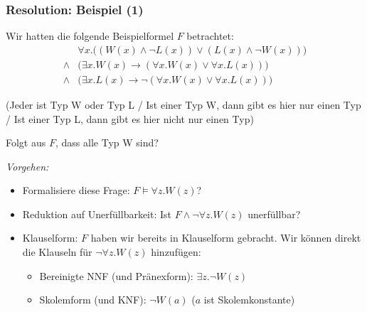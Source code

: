\documentclass[aspectratio=1610,onlymath]{beamer}
\begin{document}
\begin{frame}\frametitle{Resolution: Beispiel (1)}
 
 Wir hatten die folgende Beispielformel $F$ betrachtet:
%  
 \begin{align*}
& \forall x.\big((W(x)\wedge\neg L(x))\vee (L(x)\wedge\neg W(x))\big) \\
{}\wedge{} & \big(\exists x.W(x)\to(\forall x.W(x) \vee \forall x.L(x))\big) \\
{}\wedge{} & \big(\exists x.L(x)\to\neg(\forall x.W(x) \vee \forall x.L(x))\big)
\end{align*}

(Jeder ist Typ W oder Typ L / Ist einer Typ W, dann gibt es hier nur einen Typ / Ist einer Typ L, dann gibt es hier nicht nur einen Typ)\medskip

\alert{Folgt aus $F$, dass alle Typ W sind?}\bigskip\pause

\emph{Vorgehen:}
\begin{itemize}
\item Formalisiere diese Frage: \alert{$F\models \forall z.W(z)$?}\pause
\item Reduktion auf Unerfüllbarkeit: \alert{Ist $F\wedge\neg\forall z.W(z)$ unerfüllbar?}\pause
\item Klauselform: $F$ haben wir bereits in Klauselform gebracht. Wir können direkt die \alert{Klauseln für $\neg\forall z.W(z)$} hinzufügen:
\begin{itemize}
\item Bereinigte NNF (und Pränexform): \alert{$\exists z.\neg W(z)$}
\item Skolemform (und KNF): \alert{$\neg W(a)$} ($a$ ist Skolemkonstante)
\end{itemize}
\end{itemize}

\end{frame}
\end{document}
